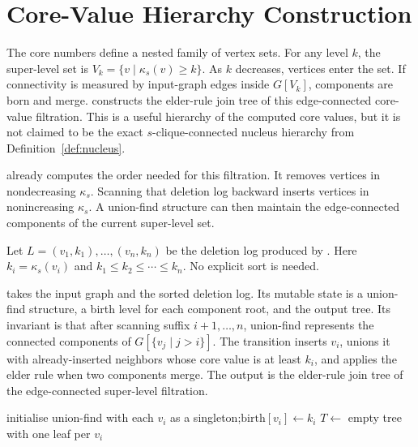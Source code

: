 \section{Core-Value Hierarchy Construction}\label{sec:buildhier}

The core numbers define a nested family of vertex sets.
%
For any level \(k\), the super-level set is \(V_k=\{v\mid \kappa_s(v)\ge k\}\).
%
As \(k\) decreases, vertices enter the set.
%
If connectivity is measured by input-graph edges inside \(G[V_k]\), components are born and merge.
%
\buildHier{} constructs the elder-rule join tree of this edge-connected core-value filtration.
%
This is a useful hierarchy of the computed core values, but it is not claimed to be the exact \(s\)-clique-connected nucleus hierarchy from Definition~\ref{def:nucleus}.

\peelH{} already computes the order needed for this filtration.
%
It removes vertices in nondecreasing \(\kappa_s\).
%
Scanning that deletion log backward inserts vertices in nonincreasing \(\kappa_s\).
%
A union-find structure can then maintain the edge-connected components of the current super-level set.

Let \(L=(v_1,k_1),\ldots,(v_n,k_n)\) be the deletion log produced by \peelH{}.
%
Here \(k_i=\kappa_s(v_i)\) and \(k_1\le k_2\le\cdots\le k_n\).
%
No explicit sort is needed.

\buildHier{} takes the input graph and the sorted deletion log.
%
Its mutable state is a union-find structure, a birth level for each component root, and the output tree.
%
Its invariant is that after scanning suffix \(i+1,\ldots,n\), union-find represents the connected components of \(G[\{v_j\mid j>i\}]\).
%
The transition inserts \(v_i\), unions it with already-inserted neighbors whose core value is at least \(k_i\), and applies the elder rule when two components merge.
%
The output is the elder-rule join tree of the edge-connected super-level filtration.

\begin{algorithm}[t]
\algfontsize
\caption{\buildHier}
\label{alg:buildhier}

initialise union-find with each \(v_i\) as a singleton;\quad \(\text{birth}[v_i]\gets k_i\)\;
\(T\gets\) empty tree with one leaf per \(v_i\)\;
\end{algorithm}

